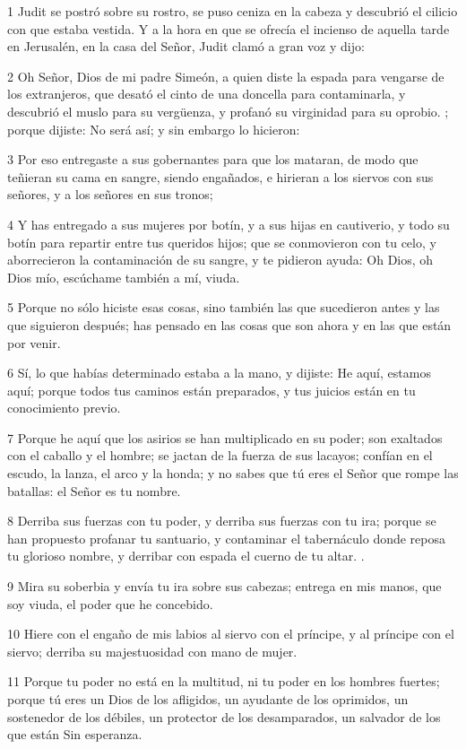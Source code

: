 \par 1 Judit se postró sobre su rostro, se puso ceniza en la cabeza y descubrió el cilicio con que estaba vestida. Y a la hora en que se ofrecía el incienso de aquella tarde en Jerusalén, en la casa del Señor, Judit clamó a gran voz y dijo:
\par 2 Oh Señor, Dios de mi padre Simeón, a quien diste la espada para vengarse de los extranjeros, que desató el cinto de una doncella para contaminarla, y descubrió el muslo para su vergüenza, y profanó su virginidad para su oprobio. ; porque dijiste: No será así; y sin embargo lo hicieron:
\par 3 Por eso entregaste a sus gobernantes para que los mataran, de modo que teñieran su cama en sangre, siendo engañados, e hirieran a los siervos con sus señores, y a los señores en sus tronos;
\par 4 Y has entregado a sus mujeres por botín, y a sus hijas en cautiverio, y todo su botín para repartir entre tus queridos hijos; que se conmovieron con tu celo, y aborrecieron la contaminación de su sangre, y te pidieron ayuda: Oh Dios, oh Dios mío, escúchame también a mí, viuda.
\par 5 Porque no sólo hiciste esas cosas, sino también las que sucedieron antes y las que siguieron después; has pensado en las cosas que son ahora y en las que están por venir.
\par 6 Sí, lo que habías determinado estaba a la mano, y dijiste: He aquí, estamos aquí; porque todos tus caminos están preparados, y tus juicios están en tu conocimiento previo.
\par 7 Porque he aquí que los asirios se han multiplicado en su poder; son exaltados con el caballo y el hombre; se jactan de la fuerza de sus lacayos; confían en el escudo, la lanza, el arco y la honda; y no sabes que tú eres el Señor que rompe las batallas: el Señor es tu nombre.
\par 8 Derriba sus fuerzas con tu poder, y derriba sus fuerzas con tu ira; porque se han propuesto profanar tu santuario, y contaminar el tabernáculo donde reposa tu glorioso nombre, y derribar con espada el cuerno de tu altar. .
\par 9 Mira su soberbia y envía tu ira sobre sus cabezas; entrega en mis manos, que soy viuda, el poder que he concebido.
\par 10 Hiere con el engaño de mis labios al siervo con el príncipe, y al príncipe con el siervo; derriba su majestuosidad con mano de mujer.
\par 11 Porque tu poder no está en la multitud, ni tu poder en los hombres fuertes; porque tú eres un Dios de los afligidos, un ayudante de los oprimidos, un sostenedor de los débiles, un protector de los desamparados, un salvador de los que están Sin esperanza.
